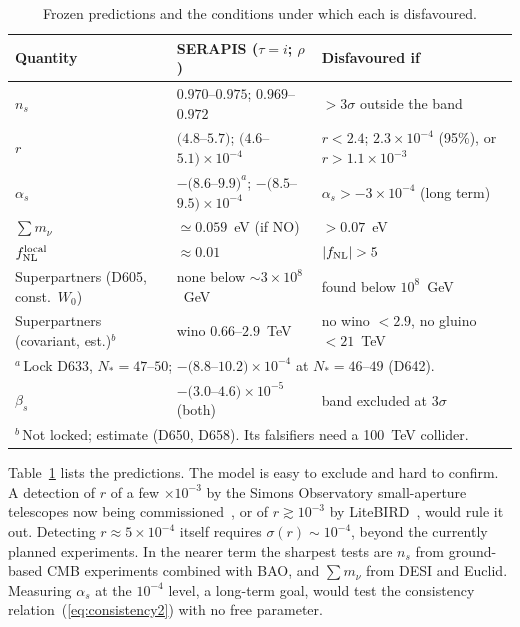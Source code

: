 \documentclass[aps,prd,twocolumn,superscriptaddress,nofootinbib,floatfix]{revtex4-2}
\begin{document}
\begin{table}[tbp]
\caption{Frozen predictions and the conditions under which each is disfavoured.}\label{tab:forward}
\begin{ruledtabular}
\begin{tabular}{lll}
Quantity & SERAPIS ($\tau=i$; $\rho$) & Disfavoured if \\
\hline
$n_s$ & $0.970$--$0.975$; $0.969$--$0.972$ & $>3\sigma$ outside the band \\
$r$ & $(4.8$--$5.7)$; $(4.6$--$5.1)\times10^{-4}$ & $r<2.4$; $2.3\times10^{-4}$ (95\%), or $r>1.1\times10^{-3}$ \\
$\alpha_s$ & $-(8.6$--$9.9)^a$; $-(8.5$--$9.5)\times10^{-4}$ & $\alpha_s>-3\times10^{-4}$ (long term) \\
$\sum m_\nu$ & $\simeq0.059$~eV (if NO) & $>0.07$~eV \\
$f_{\rm NL}^{\rm local}$ & $\approx 0.01$ & $|f_{\rm NL}|>5$ \\
Superpartners (D605, const.\ $W_0$) & none below $\sim3\times10^8$~GeV & found below $10^8$~GeV \\
Superpartners (covariant, est.)$^b$ & wino $0.66$--$2.9$~TeV & no wino $<2.9$, no gluino $<21$~TeV \\
\multicolumn{3}{l}{$^a$\,Lock D633, $N_*=47$--$50$; $-(8.8$--$10.2)\times10^{-4}$ at $N_*=46$--$49$ (D642).} \\
$\beta_s$ & $-(3.0$--$4.6)\times10^{-5}$ (both) & band excluded at $3\sigma$ \\
\multicolumn{3}{l}{$^b$\,Not locked; estimate (D650, D658). Its falsifiers need a 100~TeV collider.} \\
\end{tabular}
\end{ruledtabular}
\end{table}

Table~\ref{tab:forward} lists the predictions. The model is easy to exclude and hard to confirm. A detection of $r$ of a few $\times10^{-3}$ by the Simons Observatory small-aperture telescopes now being commissioned~\cite{arXiv_2609_26938}, or of $r\gtrsim10^{-3}$ by LiteBIRD~\cite{arXiv_2202_02773}, would rule it out. Detecting $r\approx5\times10^{-4}$ itself requires $\sigma(r)\sim10^{-4}$, beyond the currently planned experiments. In the nearer term the sharpest tests are $n_s$ from ground-based CMB experiments combined with BAO, and $\sum m_\nu$ from DESI and Euclid. Measuring $\alpha_s$ at the $10^{-4}$ level, a long-term goal, would test the consistency relation~(\ref{eq:consistency2}) with no free parameter.
\end{document}
